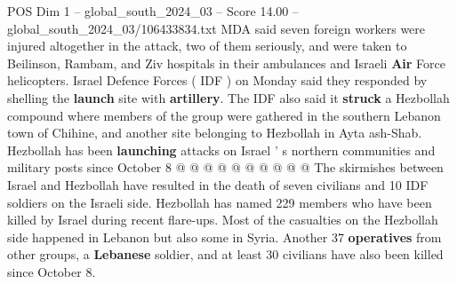 \begin{textsample}{POS Dim 1 – global\_south\_2024\_03 – Score 14.00 – global\_south\_2024\_03/106433834.txt}
MDA said seven foreign workers were injured altogether in the attack, two of them seriously, and were taken to Beilinson, Rambam, and Ziv hospitals in their ambulances and Israeli \textbf{Air} Force helicopters.
Israel Defence Forces ( IDF ) on Monday said they responded by shelling the \textbf{launch} site with \textbf{artillery}.
The IDF also said it \textbf{struck} a Hezbollah compound where members of the group were gathered in the southern Lebanon town of Chihine, and another site belonging to Hezbollah in Ayta ash-Shab.
Hezbollah has been \textbf{launching} attacks on Israel ' s northern communities and military posts since October 8 @ @ @ @ @ @ @ @ @ @ The skirmishes between Israel and Hezbollah have resulted in the death of seven civilians and 10 IDF soldiers on the Israeli side.
Hezbollah has named 229 members who have been killed by Israel during recent flare-ups.
Most of the casualties on the Hezbollah side happened in Lebanon but also some in Syria.
Another 37 \textbf{operatives} from other groups, a \textbf{Lebanese} soldier, and at least 30 civilians have also been killed since October 8.

\end{textsample}
